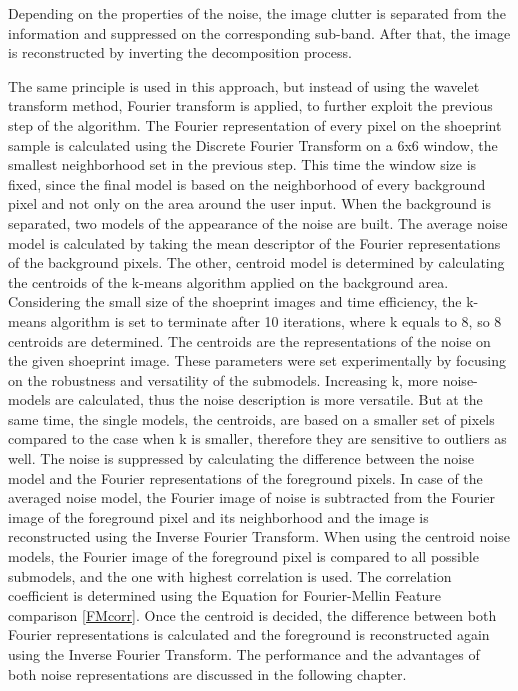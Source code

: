 \documentclass[draft,final]{vutinfth} %
\begin{document}
Depending on the properties of the noise, the image clutter is separated from the information and suppressed on the corresponding sub-band.
After that, the image is reconstructed by inverting the decomposition process. 
\par
The same principle is used in this approach, but instead of using the wavelet transform method, Fourier transform is applied, to further exploit the previous step of the algorithm.
The Fourier representation of every pixel on the shoeprint sample is calculated using the Discrete Fourier Transform on a 6x6 window, the smallest neighborhood set in the previous step.
This time the window size is fixed, since the final model is based on the neighborhood of every background pixel and not only on the area around the user input.
When the background is separated, two models of the appearance of the noise are built.
The average noise model is calculated by taking the mean descriptor of the Fourier representations of the background pixels. 
The other, centroid model is determined by calculating the centroids of the k-means algorithm applied on the background area.
Considering the small size of the shoeprint images and time efficiency, the k-means algorithm is set to terminate after 10 iterations, where k equals to 8, so 8 centroids are determined.
The centroids are the representations of the noise on the given shoeprint image.
These parameters were set experimentally by focusing on the robustness and versatility of the submodels.
Increasing k, more noise-models are calculated, thus the noise description is more versatile.
But at the same time, the single models, the centroids, are based on a smaller set of pixels compared to the case when k is smaller, therefore they are sensitive to outliers as well. 
The noise is suppressed by calculating the difference between the noise model and the Fourier representations of the foreground pixels.
In case of the averaged noise model, the Fourier image of noise is subtracted from the Fourier image of the foreground pixel and its neighborhood and the image is reconstructed using the Inverse Fourier Transform.
When using the centroid noise models, the Fourier image of the foreground pixel is compared to all possible submodels, and the one with highest correlation is used.
The correlation coefficient is determined using the Equation for Fourier-Mellin Feature comparison \ref{FMcorr}.
Once the centroid is decided, the difference between both Fourier representations is calculated and the foreground is reconstructed again using the Inverse Fourier Transform.
The performance and the advantages of both noise representations are discussed in the following chapter.
\end{document}
